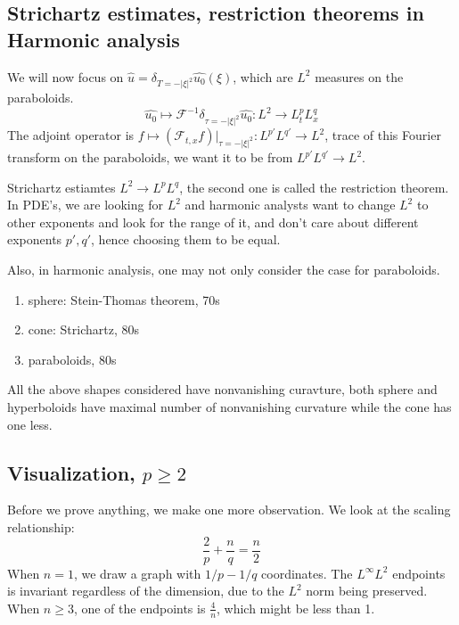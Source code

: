 \subsection{Strichartz estimates, restriction theorems in Harmonic analysis}
We will now focus on $\widehat{u}=\delta_{T=-|\xi|^2}\widehat{u_0}(\xi)$, which are $L^2$ measures on the paraboloids.
\begin{equation*}
    \widehat{u_0}\mapsto\mathcal{F}^{-1}\delta_{\tau=-|\xi|^2}\widehat{u_0}: L^2\to L_t^pL_x^q
\end{equation*}
The adjoint operator is $f\mapsto (\mathcal{F}_{t,x}f)\vert_{\tau=-|\xi|^2}: L^{p'}L^{q'}\to L^2$, trace of this Fourier transform on the paraboloids, we want it to be from $L^{p'}L^{q'}\to L^2$.

Strichartz estiamtes $L^2\to L^pL^q$, the second one is called the restriction theorem. In PDE's, we are looking for $L^2$ and harmonic analysts want to change $L^2$ to other exponents and look for the range of it, and don't care about different exponents $p', q'$, hence choosing them to be equal. 

Also, in harmonic analysis, one may not only consider the case for paraboloids.
\begin{enumerate}
    \item sphere: Stein-Thomas theorem, 70s
    \item cone: Strichartz, 80s
    \item paraboloids, 80s
\end{enumerate}
\begin{remark}
    All the above shapes considered have nonvanishing curavture, both sphere and hyperboloids have maximal number of nonvanishing curvature while the cone has one less.
\end{remark}

\subsection{Visualization, $p\geq 2$}
Before we prove anything, we make one more observation. We look at the scaling relationship:
\begin{equation*}
    \frac{2}{p}+\frac{n}{q}=\frac{n}{2}
\end{equation*}
When $n=1$, we draw a graph with $1/p-1/q$ coordinates. The $L^\infty L^2$ endpoints is invariant regardless of the dimension, due to the $L^2$ norm being preserved. When $n\geq 3$, one of the endpoints is $\frac{4}{n}$, which might be less than 1.

